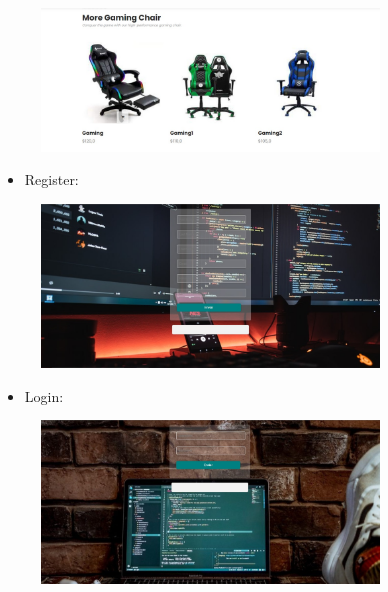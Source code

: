 \begin{figure}[H]
	\centering
	\includegraphics[width=0.8\textwidth,keepaspectratio]{img/imagen4.jpg}
\end{figure}
\begin{itemize}	
	\item Register:
\end{itemize}	
\begin{figure}[H]
	\centering
	\includegraphics[width=0.8\textwidth,keepaspectratio]{img/imagen5.jpg}
\end{figure}
\begin{itemize}	
	\item Login:
\end{itemize}	
\begin{figure}[H]
	\centering
	\includegraphics[width=0.8\textwidth,keepaspectratio]{img/imagen6.jpg}
\end{figure}
